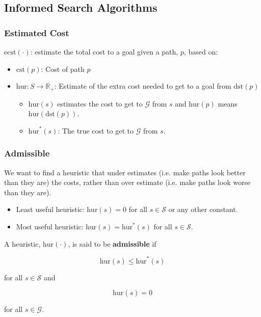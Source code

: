 \subsection{Informed Search Algorithms}
\subsubsection{Estimated Cost}
\begin{definition}
    $\text{ecst}(\cdot)$: estimate the total cost to a goal given a path, $p$, based on:
    \begin{itemize}
        \item $\text{cst}(p)$: Cost of path $p$
        \item $\text{hur}: S \to \mathbb{R}_+$: Estimate of the extra cost needed to get to a goal from $\text{dst}(p)$
        \begin{itemize}
            \item $\text{hur}(s)$ estimates the cost to get to $\mathcal{G}$ from $s$ and $\text{hur}(p)$ means $\text{hur}(\text{dst}(p))$.
            \item $\text{hur}^*(s)$: The true cost to get to $\mathcal{G}$ from $s$.
        \end{itemize}
    \end{itemize}
\end{definition}

\subsubsection{Admissible}
\begin{motivation}
    We want to find a heuristic that under estimates (i.e. make paths look better than they are) the costs, rather than over estimate (i.e. make paths look worse than they are).
    \begin{itemize}
        \item Least useful heuristic: $\text{hur}(s) = 0$ for all $s \in \mathcal{S}$ or any other constant.
        \item Most useful heuristic: $\text{hur}(s) = \text{hur}^*(s)$ for all $s \in \mathcal{S}$.
    \end{itemize}
\end{motivation}
\begin{definition}
    A heuristic, $\text{hur}(\cdot)$, is said to be \textbf{admissible} if

    \begin{equation*}
        \text{hur}(s) \leq \text{hur}^*(s)
    \end{equation*}

    for all $s \in \mathcal{S}$ and

    \begin{equation*}
        \text{hur}(s) = 0
    \end{equation*}

    for all $s \in \mathcal{G}$.
\end{definition}

